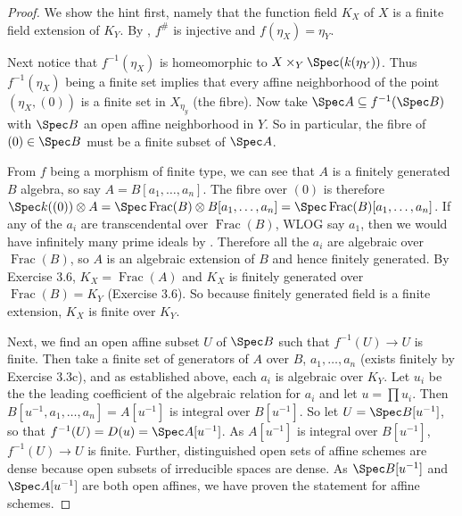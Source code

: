 \begin{proof}
	We show the hint first, namely that the function field $K_X $ of $X $ is a finite field extension of $K_Y $.
	By , $f^\# $ is injective and $f(\eta _X) = \eta _Y $.

	Next notice that $f^{-1}(\eta_X ) $ is homeomorphic to $X \times_Y \Spec(k(\eta_Y)) $.
	Thus $f^{-1}(\eta _X) $ being a finite set implies that every affine neighborhood of the point $(\eta _X, (0)) $ is a finite set in $X_{\eta _y} $ (the fibre).
	Now take $\Spec A \subseteq f^{-1}(\Spec B) $ with $\Spec B $ an open affine neighborhood in $Y $.
	So in particular, the fibre of $(0) \in \Spec B $ must be a finite subset of $\Spec A $.

	From $f $ being a morphism of finite type, we can see that $A $ is a finitely generated $B $ algebra, so say $A = B[a_{1}, \ldots ,a_n] $.
	The fibre over $(0) $ is therefore $\Spec k((0)) \otimes A = \Spec \operatorname{Frac}(B) \otimes B[a_{1},\ldots,a_n] = \Spec \operatorname{Frac}(B)[a_{1},\ldots,a_n]$.
	If any of the $a_i $ are transcendental over $\operatorname{Frac}(B) $, WLOG say $a_{1} $, then we would have infinitely many prime ideals by .%
	Therefore all the $a_i $ are algebraic over $\operatorname{Frac}(B) $, so $A $ is an algebraic extension of $B $ and hence finitely generated.
	By Exercise 3.6, $K_X = \operatorname{Frac}(A) $ and $K_X $ is finitely generated over $\operatorname{Frac}(B) = K_Y$ (Exercise 3.6).
	So because finitely generated field is a finite extension, $K_X $ is finite over $K_Y $.

	Next, we find an open affine subset $U $ of $\Spec B$ such that $f^{-1}(U)\to U$ is finite.
	Then take a finite set of generators of $A $ over $B $, $a_{1},\ldots,a_n $ (exists finitely by Exercise 3.3c), and as established above, each $a_i $ is algebraic over $K_Y $.
	Let $u_i $ be the the leading coefficient of the algebraic relation for $a_i $ and let $u = \prod u_i $.
	Then $B[u^{-1},a_1,\ldots,a_n] = A[u^{-1}] $ is integral over $B[u^{-1}] $.
	So let $U = \Spec B[u^{-1}] $, so that $f^{-1}(U) = D(u) = \Spec A[u^{-1}] $.
	As $A[u^{-1}]$ is integral over $B[u^{-1}] $, $f^{-1}(U)\to U $ is finite.
	Further, distinguished open sets of affine schemes are dense because open subsets of irreducible spaces are dense.
	As $\Spec B[u^{-1}] $ and $\Spec A[u^{-1}] $ are both open affines, we have proven the statement for affine schemes.


\end{proof}
